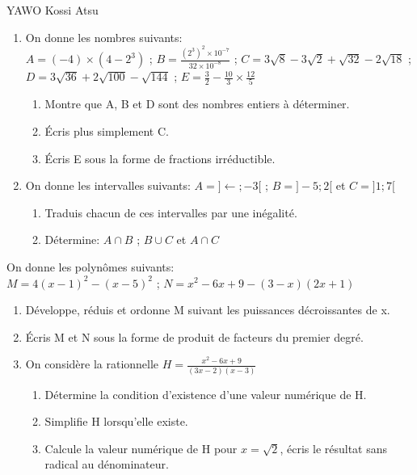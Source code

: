 \documentclass[12pt,a4paper]{book}
\newcommand{\prof}{YAWO Kossi Atsu}
\begin{document}
\begin{revision}{\prof}
\begin{exo}
\begin{enumerate}
\item On donne les nombres suivants:\\
$A=(-4) \times (4-2^3)$ \qquad ; \qquad $B=\frac{(2^3)^2 \times 10^{-7}}{32 \times 10^{-8}}$ \qquad ; \qquad $C=3\sqrt{8}-3\sqrt{2}+\sqrt{32}-2\sqrt{18}$ \qquad ; \qquad $D=3\sqrt{36}+2\sqrt{100}-\sqrt{144}$ \qquad ; \qquad 
$E=\frac{3}{2}-\frac{10}{3}\times \frac{12}{5}$
\begin{enumerate}
\item Montre que A, B et D sont des nombres entiers à déterminer. 
\item Écris plus simplement C.
\item Écris E sous la forme de fractions irréductible.
\end{enumerate}
\item On donne les intervalles suivants: $A=]\leftarrow;-3[$ \qquad ; \qquad $B=]-5;2[$ \qquad et \qquad $C=]1;7[$
\begin{enumerate}
\item Traduis chacun de ces intervalles par une inégalité.
\item Détermine: $A\cap B$ \qquad ; \qquad $B\cup C$ \qquad et \qquad $A \cap C$
\end{enumerate}
\end{enumerate}
\end{exo}

\vspace{0.3cm}
\begin{exo}[5]
On donne les polynômes suivants:\\
$M=4(x-1)^2-(x-5)^2$ \qquad ; \qquad $N=x^2-6x+9-(3-x)(2x+1)$
\begin{enumerate}
\item Développe, réduis et ordonne M suivant les puissances décroissantes de x.
\item Écris M et N sous la forme de produit de facteurs du premier degré.
\item On considère la rationnelle $H=\frac{x^2-6x+9}{(3x-2)(x-3)}$
\begin{enumerate}
\item Détermine la condition d'existence d'une valeur numérique de H.
\item Simplifie H lorsqu'elle existe.
\item Calcule la valeur numérique de H pour $x=\sqrt{2}$, écris le résultat sans radical au dénominateur.
\end{enumerate}
\end{enumerate}
\end{exo}


\end{revision}
\end{document}
